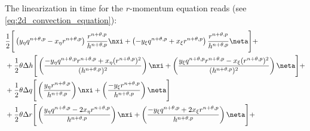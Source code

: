 The linearization in time for the $r$-momentum equation reads (see \autoref{eq:2d_convection_equation}):
\begin{align}
& \half \Bigg[ \left( y_\eta q^{n+\theta, p} - x_\eta r^{n+\theta, p} \right)
\frac{r^{n+\theta, p}}{h^{n+\theta, p}} \nxi
+ \left(-y_\xi q^{n+\theta, p} +
x_\xi r^{n+\theta, p} \right) \frac{r^{n+\theta, p}}{h^{n+\theta, p}} \neta \Bigg]+
\\
& + \half \theta \Delta h \Bigg[
\left( \frac{- y_\eta q^{n+\theta, p} r^{n+\theta, p} + x_\eta (r^{n+\theta, p})^2}{(h^{n+\theta, p})^2}
\right) \nxi +
\left( \frac{y_\xi q^{n+\theta, p}r^{n+\theta, p} - x_\xi  (r^{n+\theta, p})^2}{(h^{n+\theta, p})^2}
\right) \neta
\Bigg] +
\\
& + \half \theta \Delta q \Bigg[
\left( \frac{   y_\eta r^{n+\theta, p}}{h^{n+\theta, p}} \right) \nxi +
\left( \frac{ - y_\xi  r^{n+\theta, p}}{h^{n+\theta, p}} \right) \neta
\Bigg]
\\
& + \half \theta \Delta r \Bigg[
\left( \frac{  y_\eta q^{n+\theta, p} - 2 x_\eta r^{n+\theta, p}}{h^{n+\theta, p}} \right) \nxi+
\left( \frac{- y_\xi  q^{n+\theta, p} + 2 x_\xi  r^{n+\theta, p}}{h^{n+\theta, p}} \right) \neta
\Bigg] +
\end{align}

